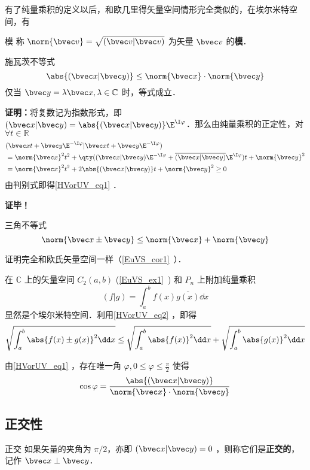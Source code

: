 有了纯量乘积的定义以后，和欧几里得矢量空间情形完全类似的，在埃尔米特空间，有
\begin{definition}{模}
称 $\norm{\bvec v}=\sqrt{(\bvec v|\bvec v)}$ 为矢量 $\bvec v$ 的\textbf{模}．
\end{definition} 
\begin{theorem}{施瓦茨不等式}
\begin{equation}\label{HVorUV_eq1}
\abs{(\bvec x|\bvec y)}\leq \norm{\bvec x}\cdot \norm{\bvec y}
\end{equation}
仅当 $\bvec y=\lambda\bvec x,\lambda\in\mathbb{C}$ 时，等式成立．
\end{theorem}
\textbf{证明：}将复数记为指数形式，即 $(\bvec x|\bvec y)=\abs{(\bvec x|\bvec y)}\E^{\I \varphi}$．那么由纯量乘积的正定性，对 $\forall t\in\mathbb{R}$
\begin{equation}
\begin{aligned}
&(\bvec x t+\bvec y\E^{-\I\varphi}|\bvec x t+\bvec y\E^{-\I\varphi})\\
&=\norm{\bvec x}^2t^2+\qty((\bvec x|\bvec y)\E^{-\I\varphi}+\overline{(\bvec x|\bvec y)}\E^{\I\varphi})t+\norm{\bvec y}^2\\
&=\norm{\bvec x}^2t^2+2\abs{(\bvec x|\bvec y)}t+\norm{\bvec y}^2\geq0
\end{aligned}
\end{equation}
由判别式即得\autoref{HVorUV_eq1} ．

\textbf{证毕！}
\begin{corollary}{三角不等式}
\begin{equation}\label{HVorUV_eq2}
\norm{\bvec x\pm\bvec y}\leq\norm{\bvec x}+\norm{\bvec y}
\end{equation}
\end{corollary}
证明完全和欧氏矢量空间一样（\autoref{EuVS_cor1}~）．
\begin{example}{}
在 $\mathbb{C}$ 上的矢量空间 $C_2(a,b)$ (\autoref{EuVS_ex1}~) 和 $P_n$ 上附加纯量乘积
\begin{equation}
(f|g)=\int_a^{b}f(x)\overline{g(x)}\dd x
\end{equation}
显然是个埃尔米特空间．利用\autoref{HVorUV_eq2} ，即得
\begin{equation}
\sqrt{\int_a^b\abs{f(x)\pm g(x)}^2\dd x}\leq\sqrt{\int_a^b\abs{f(x)}^2\dd x}+\sqrt{\int_a^b\abs{g(x)}^2\dd x}
\end{equation}
\end{example}
由\autoref{HVorUV_eq1} ，存在唯一角 $\varphi,0\leq\varphi\leq\frac{\pi}{2}$ 使得
\begin{equation}
\cos\varphi=\frac{\abs{(\bvec x|\bvec y)}}{\norm{\bvec x}\cdot \norm{\bvec y}}
\end{equation}
\subsection{正交性}
\begin{definition}{正交}
如果矢量的夹角为 $\pi/2$，亦即 $(\bvec x|\bvec y)=0$
，则称它们是\textbf{正交的}，记作 $\bvec x\perp\bvec y$．
\end{definition}